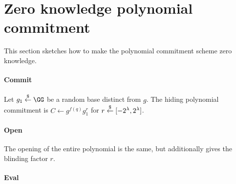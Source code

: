 \documentclass{article}
\theoremstyle{definition}
\newtheorem{corollary}{Corollary}
\newcommand{\benedikt}[1]{{\textcolor{red}{[Benedikt: #1]}}}
\newcommand{\benedikt}[1]{}
\begin{document}
\begin{comment}
 The extractor recuses with the encoding of $f(X)$ and degree $\hat{d}'=\hat{d}\cdot 2$.
 
 Repeating this $\log_2(d+1)$ times we get a polynomial $f(X)$ of degree $d$ that has coefficients that are bounded by $(d+1) \cdot p^{\log_2(d+1)+1} <q/2$. 
 


\end{proof}

\begin{corollary}
	If $q<bla$ there exists an efficient adversary that can break the evaluation binding property of the polynomial commitment.
\end{corollary}
\benedikt{Figure out at what q we can attack the scheme. Probably needs to use negative coefficients and such.}
\end{comment}




\section{Zero knowledge polynomial commitment} 
This section sketches how to make the polynomial commitment scheme zero knowledge. 

\paragraph{Commit} Let $g_1 \sample \GG$ be a random base distinct from $g$. 
The hiding polynomial commitment is $C \leftarrow g^{f(q)}g_1^r$ for $r \overset{\$}{\gets} [-2^\lambda, 2^\lambda]$. 

\paragraph{Open} The opening of the entire polynomial is the same, but additionally gives the blinding factor $r$. 

\paragraph{Eval}
\end{document}

